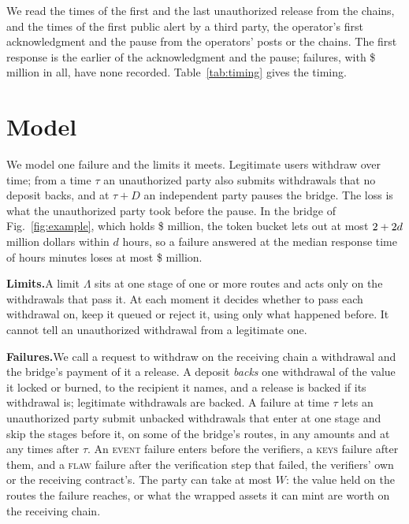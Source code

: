 \documentclass[conference,compsoc]{IEEEtran}
\numberwithin{equation}{section}
\theoremstyle{plain}
\theoremstyle{definition}
\theoremstyle{remark}
\newcommand{\runin}[1]{\par\smallskip\noindent\textbf{#1.}\enspace}
\newcommand{\cev}{\textsc{event}}
\newcommand{\ckeys}{\textsc{keys}}
\newcommand{\ccheck}{\textsc{flaw}}
\begin{document}
We read the times of the first and the last unauthorized release from the chains, and the times of the first public alert by a third party, the operator's first acknowledgment and the pause from the operators' posts or the chains. The first response is the earlier of the acknowledgment and the pause; \nUntimedEvents{} failures, with \$ million in all, have none recorded. Table~\ref{tab:timing} gives the timing.



\section{Model}\label{sec:model}

We model one failure and the limits it meets. Legitimate users withdraw over time; from a time $\tau$ an unauthorized party also submits withdrawals that no deposit backs, and at $\tau + D$ an independent party pauses the bridge. The loss is what the unauthorized party took before the pause. In the bridge of Fig.~\ref{fig:example}, which holds \$\exHeldM{} million, the token bucket lets out at most $2 + 2 d$ million dollars within $d$ hours, so a failure answered at the median response time of \medRespH{} hours \medRespM{} minutes loses at most \$\exLossM{} million.

\runin{Limits}A limit $\Lambda$ sits at one stage of one or more routes and acts only on the withdrawals that pass it. At each moment it decides whether to pass each withdrawal on, keep it queued or reject it, using only what happened before. It cannot tell an unauthorized withdrawal from a legitimate one.

\runin{Failures}We call a request to withdraw on the receiving chain a withdrawal and the bridge's payment of it a release. A deposit \emph{backs} one withdrawal of the value it locked or burned, to the recipient it names, and a release is backed if its withdrawal is; legitimate withdrawals are backed. A failure at time $\tau$ lets an unauthorized party submit unbacked withdrawals that enter at one stage and skip the stages before it, on some of the bridge's routes, in any amounts and at any times after $\tau$. An \cev{} failure enters before the verifiers, a \ckeys{} failure after them, and a \ccheck{} failure after the verification step that failed, the verifiers' own or the receiving contract's. The party can take at most $W$: the value held on the routes the failure reaches, or what the wrapped assets it can mint are worth on the receiving chain.
\end{document}
